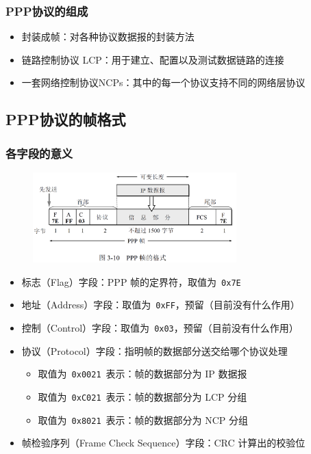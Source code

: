 \documentclass[cs4size,a4paper,10pt]{ctexart}
\begin{document}
	\subsubsection{PPP协议的组成}
	\begin{itemize}
		\item 封装成帧：对各种协议数据报的封装方法
		\item 链路控制协议 LCP：用于建立、配置以及测试数据链路的连接
		\item 一套网络控制协议NCPs：其中的每一个协议支持不同的网络层协议
	\end{itemize}

	\subsection{PPP协议的帧格式}

	\subsubsection{各字段的意义}
	\begin{figure}[H]
		\centering
		\includegraphics[width=0.7\textwidth]{img/3.10}
	\end{figure}

	\begin{itemize}
		\item 标志（Flag）字段：PPP 帧的定界符，取值为\ \verb|0x7E|
		\item 地址（Address）字段：取值为\ \verb|0xFF|，预留（目前没有什么作用）
		\item 控制（Control）字段：取值为\ \verb|0x03|，预留（目前没有什么作用）
		\item 协议（Protocol）字段：指明帧的数据部分送交给哪个协议处理
		\begin{itemize}
			\item 取值为\ \verb|0x0021|\ 表示：帧的数据部分为 IP 数据报
			\item 取值为\ \verb|0xC021|\ 表示：帧的数据部分为 LCP 分组
			\item 取值为\ \verb|0x8021|\ 表示：帧的数据部分为 NCP 分组
		\end{itemize}
		\item 帧检验序列（Frame Check Sequence）字段：CRC 计算出的校验位
	\end{itemize}
\end{document}
